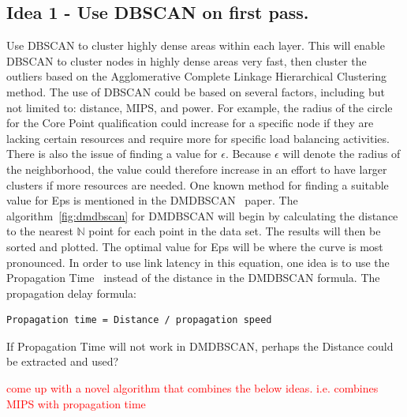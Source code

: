 \documentclass[letterpaper,twocolumn,10pt]{article}
\newcommand\todo[1]{\textcolor{red}{#1}}
\begin{document}
\subsection{Idea 1 - Use DBSCAN on first pass.}
Use DBSCAN to cluster highly dense areas within each layer. This will enable DBSCAN to cluster nodes in highly dense areas very fast, then cluster the outliers based on the Agglomerative Complete Linkage Hierarchical Clustering method. The use of DBSCAN could be based on several factors, including but not limited to: distance, MIPS, and power. For example, the radius of the circle for the Core Point qualification could increase for a specific node if they are lacking certain resources and require more for specific load balancing activities. There is also the issue of finding a value for $\epsilon$. Because $\epsilon$ will denote the radius of the neighborhood, the value could therefore increase in an effort to have larger clusters if more resources are needed. One known method for finding a suitable value for Eps is mentioned in the DMDBSCAN~\cite{dmdbscan} paper. The algorithm~\ref{fig:dmdbscan} for DMDBSCAN will begin by calculating the distance to the nearest $\mathbb{N}$ point for each point in the data set. The results will then be sorted and plotted. The optimal value for Eps will be where the curve is most pronounced. In order to use link latency in this equation, one idea is to use the Propagation Time~\cite{forouzan_fegan_2007} instead of the distance in the DMDBSCAN formula. The propagation delay formula:
\begin{verbatim}
Propagation time = Distance / propagation speed 
\end{verbatim}
If Propagation Time will not work in DMDBSCAN, perhaps the Distance could be extracted and used?

\todo{come up with a novel algorithm that combines the below ideas. i.e. combines MIPS with propagation time}
\end{document}

